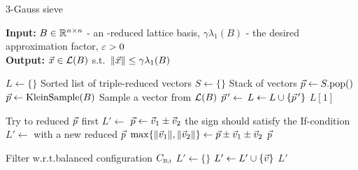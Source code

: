 \begin{algorithm}[t]
\caption{$3$-Gauss sieve}
\label{alg:3GaussSieve}
\textbf{Input:} $B \in {{\mathbb R}}^{n \times n}$ - an \LLL-reduced lattice basis, $\gamma \lambda_1(B)$ - the desired approximation factor, $\varepsilon>0$ \\
\textbf{Output:} $\vec x \in \mathcal{L}(B)$ s.t.\ $\| \vec x \| \leq \gamma \lambda_1 (B)$

\begin{algorithmic}[1]
	\State $L \gets \{\}$ \Comment Sorted list of triple-reduced vectors
	\State $S \gets \{\}$ \Comment Stack of vectors
			\State $\pvec \gets S.\text{pop()}$
		\Else
			\State $\pvec \gets \text{KleinSample}(B)$ \Comment Sample a vector from $\mathcal{L}(B)$
		\EndIf
		\State $\pvec' \gets $ 
			\State $L \gets L \union \{ \pvec'\}$
		\EndIf
	\EndWhile
	\State \Return $L[1]$
\end{algorithmic}

\vspace{10pt}

\begin{algorithmic}[1]
		 \Comment Try to reduced $\pvec$ first
			\State $L' \gets $ 
					\State $\pvec \gets \vvec_1 \pm \vvec_2$ \Comment the sign should satisfy the If-condition
				\EndIf
			\EndFor
		\EndWhile
		\State $L' \gets $  \Comment with a new reduced $\pvec$
				\State $\max \{ \| \vvec_1 \|, \| \vvec_2 \| \} \gets \pvec \pm \vvec_1 \pm \vvec_2$
			\EndIf
		\EndFor
		\State \Return $\pvec$
	\EndFunction
\end{algorithmic}

\vspace{10pt}

\begin{algorithmic}[1]
	 \Comment Filter w.r.t.\@ balanced configuration $\Cbalt$
		\State $L' \gets \{ \}$
				\State $L' \gets L' \union \{ \vvec \}$
			\EndIf
		\EndFor
		\State \Return $L'$
	\EndFunction
\end{algorithmic}

\end{algorithm}

\clearpage